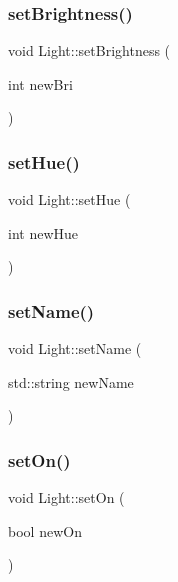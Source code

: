 \subsubsection{\texorpdfstring{set\+Brightness()}{setBrightness()}}
{\footnotesize\ttfamily void Light\+::set\+Brightness (\begin{DoxyParamCaption}\item[{int}]{new\+Bri }\end{DoxyParamCaption})\hspace{0.3cm}{\ttfamily [inline]}}

\mbox{\label{class_light_a1120d4aff3fcb5a1df425f7d08224691}} 
\subsubsection{\texorpdfstring{set\+Hue()}{setHue()}}
{\footnotesize\ttfamily void Light\+::set\+Hue (\begin{DoxyParamCaption}\item[{int}]{new\+Hue }\end{DoxyParamCaption})\hspace{0.3cm}{\ttfamily [inline]}}

\mbox{\label{class_light_acbb28a74fceea5fc98568b315e328eac}} 
\subsubsection{\texorpdfstring{set\+Name()}{setName()}}
{\footnotesize\ttfamily void Light\+::set\+Name (\begin{DoxyParamCaption}\item[{std\+::string}]{new\+Name }\end{DoxyParamCaption})\hspace{0.3cm}{\ttfamily [inline]}}

\mbox{\label{class_light_abebbcc06640fed324f219f97bbe9ebc8}} 
\subsubsection{\texorpdfstring{set\+On()}{setOn()}}
{\footnotesize\ttfamily void Light\+::set\+On (\begin{DoxyParamCaption}\item[{bool}]{new\+On }\end{DoxyParamCaption})\hspace{0.3cm}{\ttfamily [inline]}}


